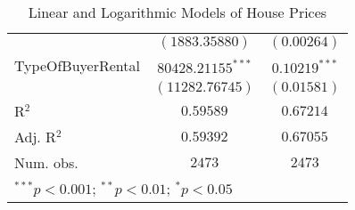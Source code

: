 \begin{table}
\begin{center}
\begin{tabular}{l c c}
                  & $(1883.35880)$          & $(0.00264)$      \\
TypeOfBuyerRental & $80428.21155^{***}$     & $0.10219^{***}$  \\
                  & $(11282.76745)$         & $(0.01581)$      \\
\hline
R$^2$             & $0.59589$               & $0.67214$        \\
Adj. R$^2$        & $0.59392$               & $0.67055$        \\
Num. obs.         & $2473$                  & $2473$           \\
\hline
\multicolumn{3}{l}{\scriptsize{$^{***}p<0.001$; $^{**}p<0.01$; $^{*}p<0.05$}}
\end{tabular}
\caption{Linear and Logarithmic Models of House Prices}
\label{tab:reg_price_w_log}
\end{center}
\end{table}
